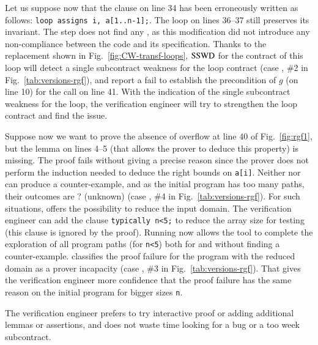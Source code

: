 Let us suppose now that the clause on line 34 has been erroneously
written as follows: \lstinline'loop assigns i, a[1..n-1];'.
The loop on lines 36--37 still preserves its invariant.
The \NCD step does not find any \NCCE, as this modification did not introduce
any non-compliance between the code and its specification.
Thanks to the replacement shown in Fig.~\ref{fig:CW-transf-loops},
$\mathrm{SSWD}$ for the contract of this loop will detect a single
subcontract weakness for the loop contract (case ,
\#2 in Fig.~\ref{tab:versions-rgf}),
and report a fail to establish the 
precondition of $g$ (on line 10) for the call on line 41.
With the indication of the single subcontract weakness for the loop, 
the verification engineer will try to strengthen the loop contract
and find the issue. 



Suppose now we want to prove the absence of overflow at line 40
of Fig.~\ref{fig:rgf1}, but the lemma on lines 4--5 
(that allows the prover to deduce this property) is missing.
The proof fails  without giving a precise reason since
the prover does not perform the induction needed to deduce the right bounds on
\lstinline'a[i]'.
Neither \NCD nor \CWD can produce a counter-example, and
as the initial program has too many paths, their outcomes are \textsf{?}
(unknown) (case , \#4 in Fig.~\ref{tab:versions-rgf}).
For such situations, \stady offers the possibility to reduce the input domain.
The verification engineer can add the \acsl clause 
\lstinline'typically n<5;' to reduce the array size 
for testing (this clause is ignored by the proof). 
Running \stady now allows the tool to complete the exploration of all
program paths (for \lstinline'n<5') both for \NCD and \CWD without finding a counter-example.
\stady classifies the proof failure for the program with 
the reduced domain as a prover incapacity (case ,
\#3 in Fig.~\ref{tab:versions-rgf}).
That gives the verification engineer more confidence that the proof failure
has the same reason on the initial program for bigger sizes \lstinline{n}.

The verification engineer prefers to  try interactive proof or adding additional
lemmas or assertions,
and does not waste time looking for a bug or a too week subcontract.




